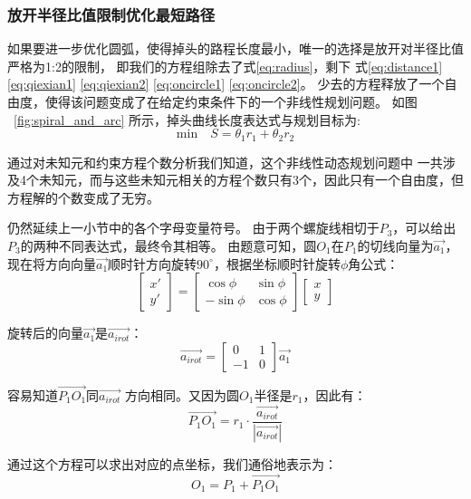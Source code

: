 \documentclass{cumcmthesis1}
\begin{document}
\subsubsection{放开半径比值限制优化最短路径}
如果要进一步优化圆弧，使得掉头的路程长度最小，唯一的选择是放开对半径比值严格为1:2的限制，
即我们的方程组除去了式\eqref{eq:radius}，剩下 式\eqref{eq:distance1} 
\eqref{eq:qiexian1}
\eqref{eq:qiexian2}
\eqref{eq:oncircle1}
\eqref{eq:oncircle2}。
少去的方程释放了一个自由度，使得该问题变成了在给定约束条件下的一个非线性规划问题。
如图
~\ref{fig:spiral_and_arc} 
所示，掉头曲线长度表达式与规划目标为:
\begin{equation}
    \text{min} \quad S=\theta_1 r_1+\theta_2 r_2
\end{equation}
\par
通过对未知元和约束方程个数分析我们知道，这个非线性动态规划问题中
一共涉及4个未知元，而与这些未知元相关的方程个数只有3个，因此只有一个自由度，但方程解的个数变成了无穷。
\par
仍然延续上一小节中的各个字母变量符号。
由于两个螺旋线相切于$P_3$，可以给出$P_3$的两种不同表达式，最终令其相等。
由题意可知，圆$O_1$在$P_1$的切线向量为$\vec{a_1}$，
现在将方向向量$\vec{a_1}$顺时针方向旋转$90^\circ$，根据坐标顺时针旋转$\phi$角公式：
\begin{equation}
    \begin{bmatrix}
        x' \\
        y'
        \end{bmatrix}
        =
        \begin{bmatrix}
        \cos\phi & \sin\phi \\
        -\sin\phi & \cos\phi
        \end{bmatrix}
        \begin{bmatrix}
        x \\
        y
        \end{bmatrix}
\end{equation}
\par
旋转后的向量$\vec{a_1}$是$\overrightarrow{a_{irot}}$：
\begin{equation}
\overrightarrow{a_{irot}}=
        \begin{bmatrix}
        0 & 1 \\
        -1 & 0
        \end{bmatrix}
        \vec{a_1}
\end{equation}
\par
容易知道$\overrightarrow{P_1 O_1}$同$\overrightarrow{a_{irot}}$
方向相同。又因为圆$O_1$半径是$r_1$，因此有：
\begin{equation}
    \overrightarrow{P_1 O_1}=r_1 \cdot \frac{\overrightarrow{a_{irot}}}{|\overrightarrow{a_{irot}}|}
\end{equation}
\par
通过这个方程可以求出对应的点坐标，我们通俗地表示为：
\begin{equation}
    O_1=P_1+\overrightarrow{P_1 O_1}
\end{equation}
\end{document}
